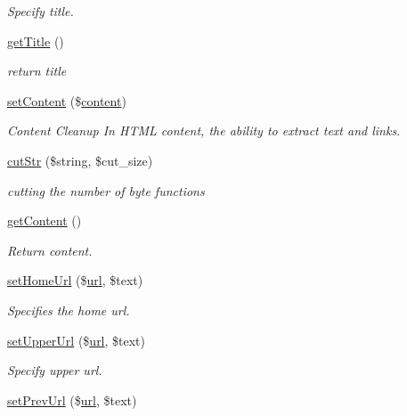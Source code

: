 \begin{DoxyCompactItemize}
\begin{DoxyCompactList}\small\item\em Specify title. \end{DoxyCompactList}\item 
\hyperlink{classmobileXE_ade6f26dcf994e29278983b5496767c14}{get\+Title} ()
\begin{DoxyCompactList}\small\item\em return title \end{DoxyCompactList}\item 
\hyperlink{classmobileXE_a1f6fe02e3cf472097a66d95b09dfaeae}{set\+Content} (\$\hyperlink{classcontent}{content})
\begin{DoxyCompactList}\small\item\em Content Cleanup In H\+T\+ML content, the ability to extract text and links. \end{DoxyCompactList}\item 
\hyperlink{classmobileXE_acd2dd9d14993324440b01d94be13e818}{cut\+Str} (\$string, \$cut\+\_\+size)
\begin{DoxyCompactList}\small\item\em cutting the number of byte functions \end{DoxyCompactList}\item 
\hyperlink{classmobileXE_aef1ad977cdc5f504ddafd1c6c6272cc1}{get\+Content} ()
\begin{DoxyCompactList}\small\item\em Return content. \end{DoxyCompactList}\item 
\hyperlink{classmobileXE_a7833bbd0ed8b32aa5461b8b89a4c2fa0}{set\+Home\+Url} (\$\hyperlink{swfupload_8js_a440a52a9004fdab0700100a6ddb49f67}{url}, \$text)
\begin{DoxyCompactList}\small\item\em Specifies the home url. \end{DoxyCompactList}\item 
\hyperlink{classmobileXE_a7f71628477316cc8845b8ca3d9857b29}{set\+Upper\+Url} (\$\hyperlink{swfupload_8js_a440a52a9004fdab0700100a6ddb49f67}{url}, \$text)
\begin{DoxyCompactList}\small\item\em Specify upper url. \end{DoxyCompactList}\item 
\hyperlink{classmobileXE_ad5d56a0b6158ecf599359ca2f1356f16}{set\+Prev\+Url} (\$\hyperlink{swfupload_8js_a440a52a9004fdab0700100a6ddb49f67}{url}, \$text)

\end{DoxyCompactItemize}
